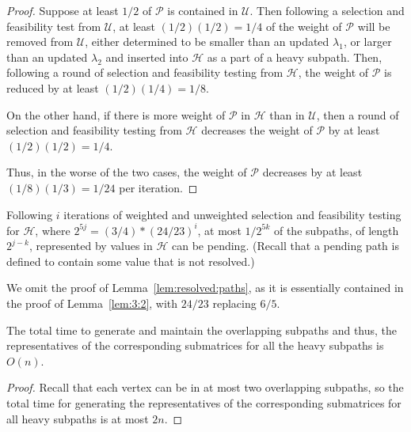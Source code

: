 \begin{proof}
Suppose at least $1/2$ of $\mathcal{P}$ is contained in $\mathcal{U}$. 
Then following a selection and feasibility test from $\mathcal{U}$, at least $(1/2)(1/2)=1/4$ of the weight of $\mathcal{P}$ will be removed from $\mathcal{U}$, either determined to be smaller than an updated $\lambda_1$, or larger than an updated $\lambda_2$ and inserted into $\mathcal{H}$ as a part of a heavy subpath. 
Then, following a round of selection and feasibility testing from $\mathcal{H}$, the weight of $\mathcal{P}$ is reduced by at least $(1/2)(1/4)=1/8$.

On the other hand, if there is more weight of $\mathcal{P}$ in $\mathcal{H}$ than in $\mathcal{U}$, then a round of selection and feasibility testing 
from $\mathcal{H}$ decreases the weight of $\mathcal{P}$ by at least $(1/2)(1/2)=1/4$.

Thus, in the worse of the two cases, the weight of $\mathcal{P}$ decreases by at least $(1/8)(1/3) = 1/24$ per iteration.
\end{proof}

\begin{lemma}
\label{lem:resolved:paths}
Following $i$ iterations of weighted and unweighted selection and feasibility testing for $\mathcal{H}$, where $2^{5j}=(3/4)*(24/23)^i$, at most $1/2^{5k}$ of the subpaths, of length $2^{j-k}$, represented by values in $\mathcal{H}$ can be pending. (Recall that a pending path is defined to contain some value that is not resolved.)
\end{lemma}
We omit the proof of Lemma~\ref{lem:resolved:paths}, as it is essentially contained in the proof of Lemma~\ref{lem:3:2}, with $24/23$ replacing $6/5$.

\begin{lemma}
\label{lem:heavy:submatrices}
The total time to generate and maintain the overlapping subpaths and thus, the representatives of the corresponding submatrices for all the heavy subpaths is $O(n)$.
\end{lemma}
\begin{proof}
Recall that each vertex can be in at most two overlapping subpaths, so the total time for generating the representatives of the corresponding submatrices for all heavy subpaths is at most $2n$. 
\end{proof}


